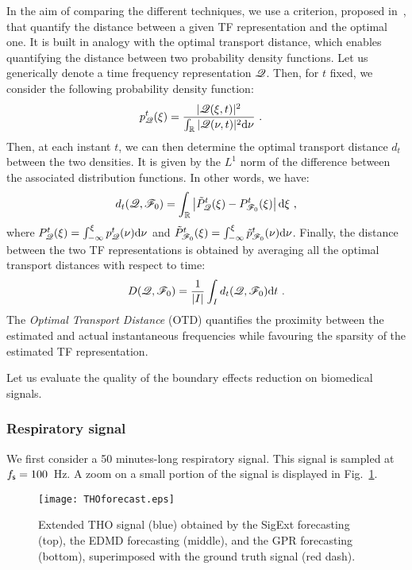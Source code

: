 In the aim of comparing the different techniques, we use a criterion, proposed in~\cite{Daubechies16conceft}, that quantify the distance between a given TF representation and the optimal one. It is built in analogy with the optimal transport distance, which enables quantifying the distance between two probability density functions. Let us generically denote a time frequency representation ${\mathscr Q}$. Then, for $t$ fixed, we consider the following probability density function:
\begin{align}
p_\ccQ^t(\xi) &= \dfrac{|\ccQ(\xi,t)|^2}{\int_\RR |\ccQ(\nu,t)|^2\dd\nu}\ .
\label{eq:ppdf}
\end{align}
Then, at each instant $t$, we can then determine the optimal transport distance $d_{t}$ between the two densities. It is given by the $L^1$ norm of the difference between the associated distribution functions. In other words, we have:
\begin{equation*}
d_{t}(\ccQ,\ccF_0) = \int_\RR\left|\tilde P_{\ccQ}^t(\xi)-  P_{\ccF_0}^t(\xi)\right|\dd\xi\ ,
\end{equation*}
where $P_{{\mathscr Q}}^t(\xi)=\int_{-\infty}^\xi p_{{\mathscr Q}}^t(\nu)\mathrm{d}\nu$ and $\tilde P_{{\mathscr F}_0}^t(\xi)=\int_{-\infty}^\xi\tilde p_{{\mathscr F}_0}^t(\nu)\mathrm{d}\nu$.
Finally, the distance between the two TF representations is obtained by averaging all the optimal transport distances with respect to time:
\begin{equation}
D({\mathscr Q},{\mathscr F}_0) = \frac1{|I|}\int_I d_{t}({\mathscr Q},{\mathscr F}_0)\mathrm{d}t\ .
\end{equation}
The \textit{Optimal Transport Distance} (OTD) quantifies the proximity between the estimated and actual instantaneous frequencies while favouring the sparsity of the estimated TF representation.

Let us evaluate the quality of the boundary effects reduction on biomedical signals.


\subsubsection{Respiratory signal}
We first consider a 50 minutes-long respiratory signal. This signal is sampled at $f_{\mathsf s}=100$~Hz. A zoom on a small portion of the signal is displayed in Fig.~\ref{fig:tho}.

\begin{figure}
\texttt{[image: THOforecast.eps]}
\caption{Extended THO signal (blue) obtained by the {\sf SigExt} forecasting (top), the EDMD forecasting (middle), and the GPR forecasting (bottom), superimposed with the ground truth signal (red dash).}
\label{fig:tho}
\end{figure}

